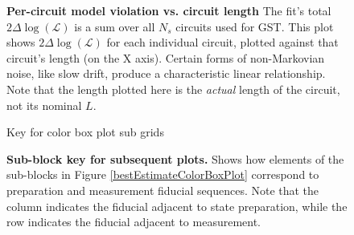 \documentclass{article}[11pt]
\newcommand{\putfield}[2]{#2}
\begin{document}
{{\begin{figure}
  \begin{center}
    \begin{adjustbox}{max width=\textwidth}
      \putfield{bestEstimateColorScatterPlot}{}
    \end{adjustbox}
    \caption{\textbf{Per-circuit model violation vs. circuit length} The fit's total $2\Delta\log(\mathcal{L})$ is a sum over all $N_s$ circuits used for GST.  This plot shows $2\Delta\log(\mathcal{L})$ for each individual circuit, plotted against that circuit's length (on the X axis).  Certain forms of non-Markovian noise, like slow drift, produce a characteristic linear relationship.  Note that the length plotted here is the \emph{actual} length of the circuit, not its nominal $L$.}
  \end{center}
\end{figure}


\begin{figure}
  \begin{center}
    \begin{adjustbox}{max width=\textwidth}
      \putfield{colorBoxPlotKeyPlot}{Key for color box plot sub grids}
    \end{adjustbox}
    \caption{\textbf{Sub-block key for subsequent plots.} Shows how elements of the sub-blocks in Figure \ref{bestEstimateColorBoxPlot} correspond to preparation and measurement fiducial sequences.  Note that the column indicates the fiducial adjacent to state preparation, while the row indicates the fiducial adjacent to measurement.\label{colorBoxPlotKeyPlot}}
  \end{center}
\end{figure}


}}
\end{document}
